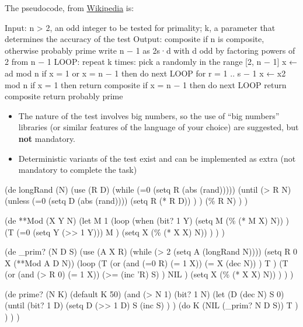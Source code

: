 The pseudocode, from
\href{http://en.wikipedia.org/wiki/Miller-Rabin\_primality\_test\#Algorithm\_and\_running\_time}{Wikipedia}
is:

\begin{wideverbatim}
Input: n > 2, an odd integer to be tested for primality;
       k, a parameter that determines the accuracy of the test
Output: composite if n is composite, otherwise probably prime
write n − 1 as 2s·d with d odd by factoring powers of 2 from n − 1
LOOP: repeat k times:
   pick a randomly in the range [2, n − 1]
   x ← ad mod n
   if x = 1 or x = n − 1 then do next LOOP
   for r = 1 .. s − 1
      x ← x2 mod n
      if x = 1 then return composite
      if x = n − 1 then do next LOOP
   return composite
return probably prime
\end{wideverbatim}

\begin{itemize}
\item
  The nature of the test involves big numbers, so the use of ``big
  numbers'' libraries (or similar features of the language of your
  choice) are suggested, but \textbf{not} mandatory.
\item
  Deterministic variants of the test exist and can be implemented as
  extra (not mandatory to complete the task)
\end{itemize}



\begin{wideverbatim}

(de longRand (N)
   (use (R D)
      (while (=0 (setq R (abs (rand)))))
      (until (> R N)
         (unless (=0 (setq D (abs (rand))))
            (setq R (* R D)) ) )
      (\% R N) ) )

(de **Mod (X Y N)
   (let M 1
      (loop
         (when (bit? 1 Y)
            (setq M (\% (* M X) N)) )
         (T (=0 (setq Y (>> 1 Y)))
            M )
         (setq X (\% (* X X) N)) ) ) )

(de _prim? (N D S)
   (use (A X R)
      (while (> 2 (setq A (longRand N))))
      (setq R 0  X (**Mod A D N))
      (loop
         (T
            (or
               (and (=0 R) (= 1 X))
               (= X (dec N)) )
            T )
         (T
            (or
               (and (> R 0) (= 1 X))
               (>= (inc 'R) S) )
            NIL )
         (setq X (\% (* X X) N)) ) ) )

(de prime? (N K)
   (default K 50)
   (and
      (> N 1)
      (bit? 1 N)
      (let (D (dec N)  S 0)
         (until (bit? 1 D)
            (setq
               D  (>> 1 D)
               S  (inc S) ) )
         (do K
            (NIL (_prim? N D S))
            T ) ) ) )

\end{wideverbatim}

